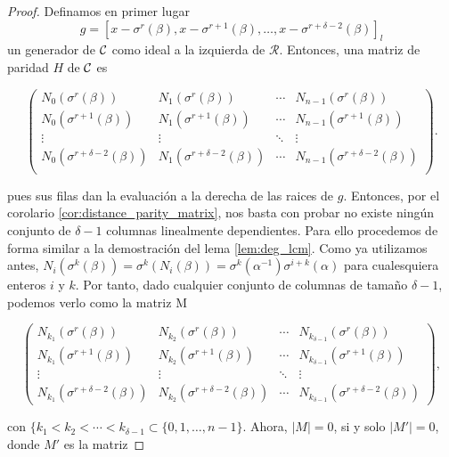 \begin{proof}
Definamos en primer lugar
\[
g = {[x - \sigma^r(\beta), x - \sigma^{r+1}(\beta), \dots, x - \sigma^{r+\delta -2}(\beta)]}_l
\]
un generador de \(\mathcal{C}\) como ideal a la izquierda de \(\mathcal{R}\). Entonces, una matriz de paridad \(H\) de \(\mathcal{C}\) es

\[
\begin{pmatrix}
    N_0(\sigma^r(\beta)) & N_1(\sigma^r(\beta)) & \cdots & N_{n-1}(\sigma^r(\beta)) \\
    N_0(\sigma^{r+1}(\beta)) & N_1(\sigma^{r+1}(\beta)) & \cdots & N_{n-1}(\sigma^{r+1}(\beta)) \\
    \vdots & \vdots & \ddots & \vdots \\
    N_0(\sigma^{r+\delta-2}(\beta)) & N_1(\sigma^{r+\delta-2}(\beta)) & \cdots & N_{n-1}(\sigma^{r+\delta-2}(\beta)) \\
\end{pmatrix}
.\]

pues sus filas dan la evaluación a la derecha de las raices de \(g\). Entonces, por el corolario \ref{cor:distance_parity_matrix}, nos basta con probar no existe ningún conjunto de \(\delta -1\) columnas linealmente dependientes. Para ello procedemos de forma similar a la demostración del lema \ref{lem:deg_lcm}. Como ya utilizamos antes, \(N_i(\sigma^k(\beta)) = \sigma^k(N_i(\beta)) = \sigma^k(\alpha^{-1})\sigma^{i+k}(\alpha)\) para cualesquiera enteros \(i\) y \(k\). Por tanto, dado cualquier conjunto de columnas de tamaño \(\delta -1\), podemos verlo como la matriz M

\[
\begin{pmatrix}
    N_{k_1}(\sigma^r(\beta)) & N_{k_2}(\sigma^r(\beta)) & \cdots & N_{k_{\delta-1}}(\sigma^r(\beta)) \\
    N_{k_1}(\sigma^{r+1}(\beta)) & N_{k_2}(\sigma^{r+1}(\beta)) & \cdots & N_{k_{\delta-1}}(\sigma^{r+1}(\beta)) \\
    \vdots & \vdots & \ddots & \vdots \\
    N_{k_1}(\sigma^{r+\delta-2}(\beta)) & N_{k_2}(\sigma^{r+\delta-2}(\beta)) & \cdots & N_{k_{\delta-1}}(\sigma^{r+\delta-2}(\beta))
\end{pmatrix}
,\]

con \(\{k_1 < k_2 < \cdots < k_{\delta-1} \subset \{0, 1, \dots, n-1\}\). Ahora, \(|M| = 0\), si y solo \(|M'| =0\), donde \(M'\) es la matriz


\end{proof}

